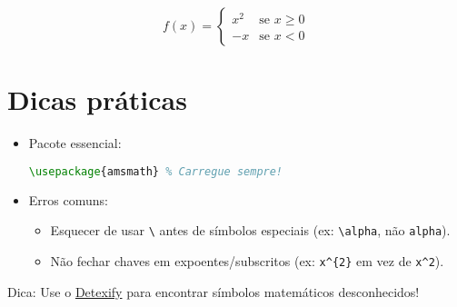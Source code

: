 \[
f(x) = 
\begin{cases}
x^{2} & \text{se } x \geq 0 \\
-x & \text{se } x < 0
\end{cases}
\]

\section{Dicas práticas}

\begin{itemize}
    \item Pacote essencial:
    \begin{lstlisting}[language=tex, caption=Carregue o pacote \texttt{amsmath}]
    \usepackage{amsmath} % Carregue sempre!
    \end{lstlisting}
    \item Erros comuns:
    \begin{itemize}
        \item Esquecer de usar \verb|\| antes de símbolos especiais (ex: \verb|\alpha|, não \verb|alpha|).
        \item Não fechar chaves em expoentes/subscritos (ex: \verb|x^{2}| em vez de \verb|x^2|).
    \end{itemize}
\end{itemize}

Dica: Use o \href{https://detexify.kirelabs.org/classify.html}{Detexify} para encontrar símbolos matemáticos desconhecidos!